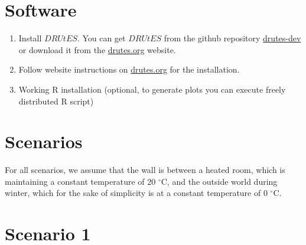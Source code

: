 \documentclass[
10pt, %
a4paper, %
oneside, %
headinclude,footinclude, %
BCOR5mm, %
]{scrartcl}
\begin{document}
\section{Software}

\begin{enumerate}
\item Install $DRUtES$. You can get $DRUtES$ from the github repository \href{https://github.com/michalkuraz/drutes-dev/} {drutes-dev} or download it from the \href{http://drutes.org/public/?core=account}{drutes.org} website. 
\item Follow website instructions on \href{http://drutes.org/public/?core=account}{drutes.org} for the installation.
\item Working R installation (optional, to generate plots you can execute freely distributed R script) 
\end{enumerate}

\newpage
\section{Scenarios}

For all scenarios, we assume that the wall is between a heated room, which is maintaining a constant temperature of 20 $^{\circ}$C, and the outside world during winter, which for the sake of simplicity is at a constant temperature of 0 $^{\circ}$C.

\begin{table}[!h]\caption{\label{tab_heat}Material properties needed for scenarios.}
\end{table}


\section*{Scenario 1}
\end{document}
